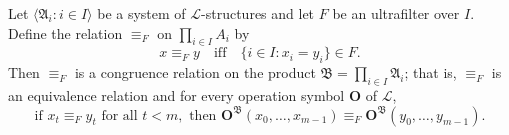 Let $\langle \mathfrak{A}_i : i \in I \rangle$ be a system of $\mathcal{L}$-structures and let $F$ be an ultrafilter over $I$. Define the relation $\equiv_F$ on $\prod_{i \in I} A_i$ by
$$x \equiv_F y \quad \text{iff} \quad \{i \in I : x_i = y_i\} \in F.$$
Then $\equiv_F$ is a congruence relation on the product $\mathfrak{B} = \prod_{i \in I} \mathfrak{A}_i$; that is, $\equiv_F$ is an equivalence relation and for every operation symbol $\mathbf{O}$ of $\mathcal{L}$,
$$\text{if } x_t \equiv_F y_t \text{ for all } t < m, \text{ then } \mathbf{O}^{\mathfrak{B}}(x_0, \ldots, x_{m-1}) \equiv_F \mathbf{O}^{\mathfrak{B}}(y_0, \ldots, y_{m-1}).$$
